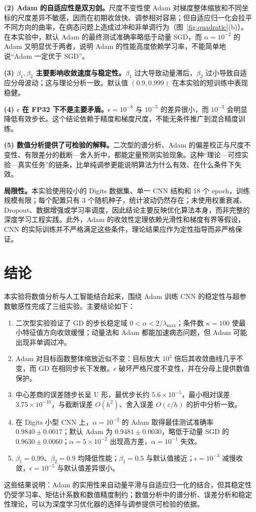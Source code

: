 \documentclass[12pt,a4paper]{ctexart}
\begin{document}
\textbf{(2) Adam 的自适应性是双刃剑。}尺度不变性使 Adam 对梯度整体缩放和不同坐标的尺度差异不敏感，因而在初期收敛快、调参相对容易；但自适应归一化会拉平不同方向的曲率，在病态问题上造成过冲和非单调行为（图~\ref{fig:quadratic}(b)）。在本实验中，默认 Adam 的最终测试准确率略低于动量 SGD，而 $\alpha=10^{-2}$ 的 Adam 又明显优于两者，说明 Adam 的性能高度依赖学习率，不能简单地说“Adam 一定优于 SGD”。

\textbf{(3) $\beta_1,\beta_2$ 主要影响收敛速度与稳定性。}$\beta_1$ 过大导致动量滞后，$\beta_2$ 过小导致自适应分母波动；这与理论分析一致。默认值 $(0.9,0.999)$ 在本实验的短训练中表现稳健。

\textbf{(4) $\epsilon$ 在 FP32 下不是主要矛盾。}$\epsilon=10^{-8}$ 与 $10^{-5}$ 的差异很小，而 $10^{-3}$ 会明显降低有效步长。这个结论依赖于精度和梯度尺度，不能无条件推广到混合精度训练。

\textbf{(5) 数值分析提供了可检验的解释。}二次型的谱分析、Adam 的偏差校正与尺度不变性、有限差分的截断—舍入折中，都能定量预测实验现象。这种“理论—可控实验—真实任务”的链条，比单纯调参更能说明算法为什么有效、在什么条件下失效。

\textbf{局限性。}本实验使用较小的 Digits 数据集、单一 CNN 结构和 18 个 epoch，训练规模有限；每个配置只有 3 个随机种子，统计波动仍然存在；未使用权重衰减、Dropout、数据增强或学习率调度，因此结论主要反映优化算法本身，而非完整的深度学习工程实践。此外，Adam 的收敛性定理依赖光滑性和梯度有界等假设，CNN 的实际训练并不严格满足这些条件，理论结果应作为定性指导而非严格保证。

\section{结论}
本实验将数值分析与人工智能结合起来，围绕 Adam 训练 CNN 的稳定性与超参数敏感性完成了三组实验。主要结论如下：
\begin{enumerate}[label=(\arabic*),itemsep=0.3em]
\item 二次型实验验证了 GD 的步长稳定域 $0<\alpha<2/\lambda_{\max}$；条件数 $\kappa=100$ 使最小特征值方向收敛缓慢；动量法和 Adam 都能加速病态问题，但 Adam 可能出现非单调过冲。
\item Adam 对目标函数整体缩放近似不变：目标放大 $10^3$ 倍后其收敛曲线几乎不变，而 GD 在相同步长下发散。$\epsilon$ 破坏严格尺度不变性，并在分母上提供数值保护。
\item 中心差商的误差随步长呈 U 形，最优步长约 $5.6\times10^{-5}$，最小相对误差 $3.75\times10^{-10}$，与截断误差 $O(h^2)$、舍入误差 $O(\varepsilon/h)$ 的折中分析一致。
\item 在 Digits 小型 CNN 上，$\alpha=10^{-2}$ 的 Adam 取得最佳测试准确率 $0.9840\pm0.0017$；默认 Adam 为 $0.9481\pm0.0030$，略低于动量 SGD 的 $0.9630\pm0.0060$；$\alpha=5\times10^{-2}$ 出现高方差，$\alpha=10^{-1}$ 失效。
\item $\beta_1=0.99$、$\beta_2=0.9$ 均降低性能；$\beta_1=0.5$ 与默认值接近；$\epsilon=10^{-3}$ 减慢收敛，$\epsilon=10^{-5}$ 与默认值差异很小。
\end{enumerate}
这些结果说明：Adam 的实用性来自动量平滑与自适应归一化的结合，但其稳定性仍受学习率、矩估计系数和数值精度制约；数值分析中的谱分析、误差分析和稳定性理论，可以为深度学习优化器的选择与调参提供可检验的依据。
\end{document}
